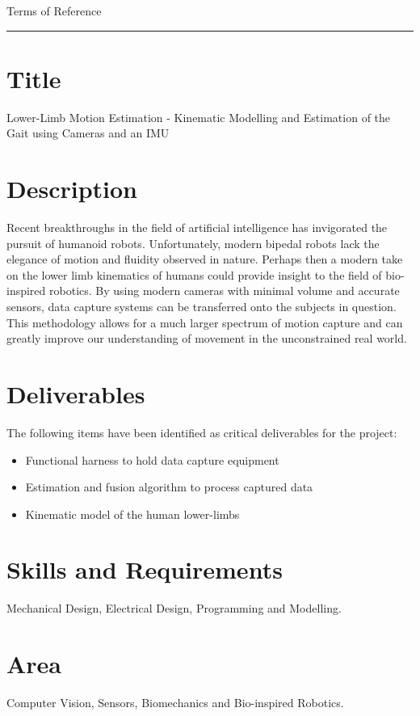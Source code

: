 \pagestyle{plain}


{\Large Terms of Reference}\\
\hrule
\vskip 5mm

\section*{Title}
Lower-Limb Motion Estimation - Kinematic Modelling and Estimation of the Gait using Cameras and an IMU

\section*{Description}
Recent breakthroughs in the field of artificial intelligence has invigorated the pursuit of humanoid robots. Unfortunately, modern bipedal robots lack the elegance of motion and fluidity observed in nature. Perhaps then a modern take on the lower limb kinematics of humans could provide insight to the field of bio-inspired robotics. By using modern cameras with minimal volume and accurate sensors, data capture systems can be transferred onto the subjects in question. This methodology allows for a much larger spectrum of motion capture and can greatly improve our understanding of movement in the unconstrained real world.

\section*{Deliverables}
The following items have been identified as critical deliverables for the project:

\begin{itemize}
  \item Functional harness to hold data capture equipment 
  \item	Estimation and fusion algorithm to process captured data 
  \item Kinematic model of the human lower-limbs 
\end{itemize}

\section*{Skills and Requirements}
  Mechanical Design, Electrical Design, Programming and Modelling.

\section*{Area}
  Computer Vision, Sensors, Biomechanics and Bio-inspired Robotics.
